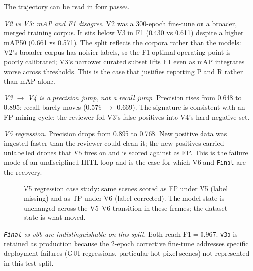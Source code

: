 \documentclass[12pt,a4paper,oneside,openright]{book}
\begin{document}
The trajectory can be read in four passes.

\emph{V2 vs V3: mAP and F1 disagree.} V2 was a 300-epoch fine-tune on a broader, merged training corpus. It sits below V3 in F1 (0.430 vs 0.611) despite a higher mAP50 (0.661 vs 0.571). The split reflects the corpora rather than the models: V2's broader corpus has noisier labels, so the F1-optimal operating point is poorly calibrated; V3's narrower curated subset lifts F1 even as mAP integrates worse across thresholds. This is the case that justifies reporting P and R rather than mAP alone.

\emph{V3 $\to$ V4 is a precision jump, not a recall jump.} Precision rises from 0.648 to 0.895; recall barely moves (0.579 $\to$ 0.669). The signature is consistent with an FP-mining cycle: the reviewer fed V3's false positives into V4's hard-negative set.

\emph{V5 regression.} Precision drops from 0.895 to 0.768. New positive data was ingested faster than the reviewer could clean it; the new positives carried unlabelled drones that V5 fires on and is scored against as FP. This is the failure mode of an undisciplined HITL loop and is the case for which V6 and \texttt{Final} are the recovery.

\begin{figure}[htbp]
    \centering
    \caption{V5 regression case study: same scenes scored as FP under V5 (label missing) and as TP under V6 (label corrected). The model state is unchanged across the V5--V6 transition in these frames; the dataset state is what moved.}
    \label{fig:v5_regression}
\end{figure}

\emph{\texttt{Final} vs v3b are indistinguishable on this split.} Both reach F1$=$0.967. \texttt{v3b} is retained as production because the 2-epoch corrective fine-tune addresses specific deployment failures (GUI regressions, particular hot-pixel scenes) not represented in this test split.

\end{document}
